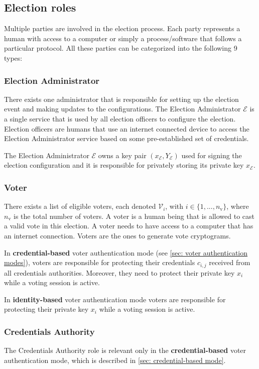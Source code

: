 \subsection{Election roles} \label{sec: election roles}
Multiple parties are involved in the election process. Each party represents a human with access to a computer or simply a process/software that follows a particular protocol. All these parties can be categorized into the following 9 types: 


\subsubsection{Election Administrator}
There exists one administrator that is responsible for setting up the election event and making updates to the configurations. The Election Administrator $\mathcal{E}$ is a single service that is used by all election officers to configure the election. Election officers are humans that use an internet connected device to access the Election Administrator service based on some pre-established set of credentials.

The Election Administrator $\mathcal{E}$ owns a key pair $(x_\mathcal{E}, Y_\mathcal{E})$ used for signing the election configuration and it is responsible for privately storing its private key $x_\mathcal{E}$.


\subsubsection{Voter}
There exists a list of eligible voters, each denoted $\mathcal{V}_i$, with \( i \in \{ 1, ..., n_\mathrm{v} \} \), where $n_\mathrm{v}$ is the total number of voters.  A voter is a human being that is allowed to cast a valid vote in this election. A voter needs to have access to a computer that has an internet connection. Voters are the ones to generate vote cryptograms.

In \textbf{credential-based} voter authentication mode (see \cref{sec: voter authentication modes}), voters are responsible for protecting their credentials $c_{i,j}$ received from all credentials authorities. Moreover, they need to protect their private key $x_i$ while a voting session is active.

In \textbf{identity-based} voter authentication mode voters are responsible for protecting their private key $x_i$ while a voting session is active.


\subsubsection{Credentials Authority}
The Credentials Authority role is relevant only in the \textbf{credential-based} voter authentication mode, which is described in \cref{sec: credential-based mode}.
    
